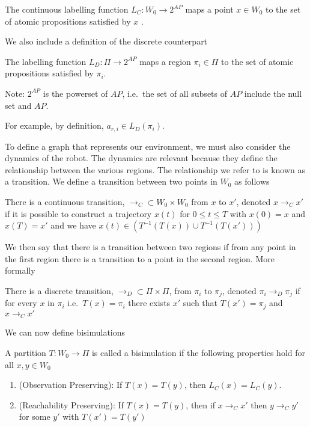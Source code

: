 \theoremstyle{definition}
\begin{definition}
\label{defCLF}
The continuous labelling function $L_C:W_0 \rightarrow 2^{AP}$ maps a point $x \in W_0$ to the set of atomic propositions satisfied by $x$ \cite{guo15}.
\end{definition} 

We also include a definition of the discrete counterpart 

\theoremstyle{definition}
\begin{definition}
\label{defDLF}
The labelling function $L_D:\Pi\rightarrow 2^{AP}$ maps a region $\pi_i \in \Pi$ to the set of atomic propositions satisfied by $\pi_i$.
\end{definition} 
Note: $2^{AP}$ is the powerset of $AP$, i.e.\ the set of all subsets of $AP$ include the null set and $AP$.

For example, by definition, $a_{r,i} \in L_D(\pi_i)$. 

To define a graph that represents our environment, we must also consider the dynamics of the robot. The dynamics are relevant because they define the relationship between the various regions. The relationship we refer to is known as a transition. We define a transition between two points in $W_0$ as follows
\theoremstyle{definition}
\begin{definition}
\label{defCTransition}
There is a continuous transition, $\rightarrow_C \subset W_0 \times W_0$ from $x$ to $x'$, denoted $x \rightarrow_C x'$ if it is possible to construct a trajectory $x(t)$ for $0 \leq t \leq T$ with $x(0)=x$ and $x(T) =x'$ and we have $x(t) \in (T^{-1}(T(x))\cup T^{-1}(T(x')))$ \cite{fainekos09}
\end{definition}

We then say that there is a transition between two regions if from any point in the first region there is a transition to a point in the second region. More formally

\theoremstyle{definition}
\begin{definition}
\label{defDTransition}
There is a discrete transition, $\rightarrow_D \subset \Pi \times \Pi$, from $\pi_i$ to $\pi_j$, denoted $\pi_i \rightarrow_D \pi_j$ if for every $x$ in $\pi_i$ i.e.\ $T(x) = \pi_i$ there exists $x'$ such that $T(x')=\pi_j$ and $x \rightarrow_C x'$
\end{definition}

We can now define bisimulations
\theoremstyle{definition}
\begin{definition}
\label{def:bisim}
A partition $T:W_0\rightarrow \Pi$ is called a bisimulation \cite{fainekos09} if the following properties hold for all $x,y \in W_0$
\begin{enumerate}
    \item (Observation Preserving): If $T(x)=T(y)$, then $L_C(x) = L_C(y)$.
    \item (Reachability Preserving): If $T(x) = T(y)$, then if $x\rightarrow_C x'$ then $y \rightarrow_C y'$ for some $y'$ with $T(x')=T(y')$
\end{enumerate}
\end{definition}

